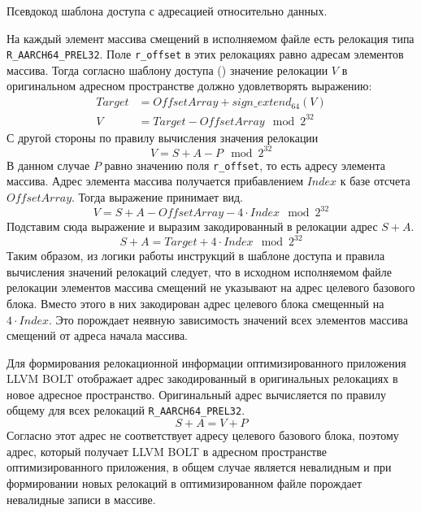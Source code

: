 \documentclass{mipt-thesis-bs}
\begin{document}
    \begin{listing}[h!]
        \inputminted{gas}{src/jump_table_Array_pseudo.s}
        \caption{Псевдокод шаблона доступа с адресацией относительно данных.}
        \label{fig:jt_datarel_pseudo}
    \end{listing}

    На каждый элемент массива смещений в исполняемом файле есть релокация типа \verb|R_AARCH64_PREL32|. Поле \verb|r_offset| в этих релокациях равно адресам элементов массива. Тогда согласно шаблону доступа () значение релокации $V$ в оригинальном адресном пространстве должно удовлетворять выражению:
    \begin{align}
        Target &= OffsetArray + sign\_extend_{64}(V)
        \label{eq:datarel_target_val}\\
        V &= Target - OffsetArray \mod 2^{32}
        \label{eq:datarel_reloc_val_target}
    \end{align}
    С другой стороны по правилу вычисления значения релокации 
    \begin{equation}
        V = S + A - P \mod 2^{32}
        \label{eq:datarel_reloc_val}
    \end{equation}
    В данном случае $P$ равно значению поля \verb|r_offset|, то есть адресу элемента массива. Адрес элемента массива получается прибавлением $Index$ к базе отсчета $OffsetArray$. Тогда выражение  принимает вид.
    \begin{equation*}
        V = S + A - OffsetArray - 4 \cdot Index \mod 2^{32}
    \end{equation*}
    Подставим сюда выражение  и выразим закодированный в релокации адрес $S + A$.
    \begin{equation}
        S + A = Target + 4 \cdot Index \mod 2^{32}
        \label{eq:true_reloc_val}
    \end{equation}
    Таким образом, из логики работы инструкций в шаблоне доступа и правила вычисления значений релокаций следует, что в исходном исполняемом файле релокации элементов массива смещений не указывают на адрес целевого базового блока. Вместо этого в них закодирован адрес целевого блока смещенный на $4 \cdot Index$. Это порождает неявную зависимость значений всех элементов массива смещений от адреса начала массива.

    Для формирования релокационной информации оптимизированного приложения LLVM BOLT отображает адрес закодированный в оригинальных релокациях в новое адресное пространство. Оригинальный адрес вычисляется по правилу общему для всех релокаций \verb|R_AARCH64_PREL32|.
    $$S + A = V + P$$
    Согласно  этот адрес не соответствует адресу целевого базового блока, поэтому адрес, который получает LLVM BOLT в адресном пространстве оптимизированного приложения, в общем случае является невалидным и при формировании новых релокаций в оптимизированном файле порождает невалидные записи в массиве.
\end{document}

